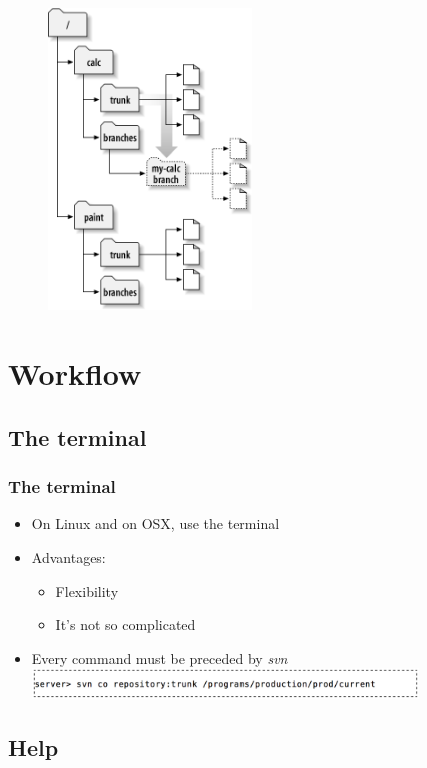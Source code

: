 \documentclass{beamer}
\begin{document}
\frame
{
	\begin{figure}[H]
	\centering
	\includegraphics[height=8cm]{branches2.png}
	\end{figure}


}

\section{Workflow}


\subsection{The terminal}

\frame
{
  \frametitle{The terminal}
  
  \begin{itemize}
  \item<1-> On Linux and on OSX, use the terminal
  \item<1-> Advantages:
  	\begin{itemize}
	\item<1-> Flexibility
	\item<1-> It's not so complicated
	\end{itemize}
  \item<3-> Every command must be preceded by \textit{svn}
  \includegraphics[height=0.8cm]{svn_example.png}
  \end{itemize}
	
}

\subsection{Help}
\end{document}
